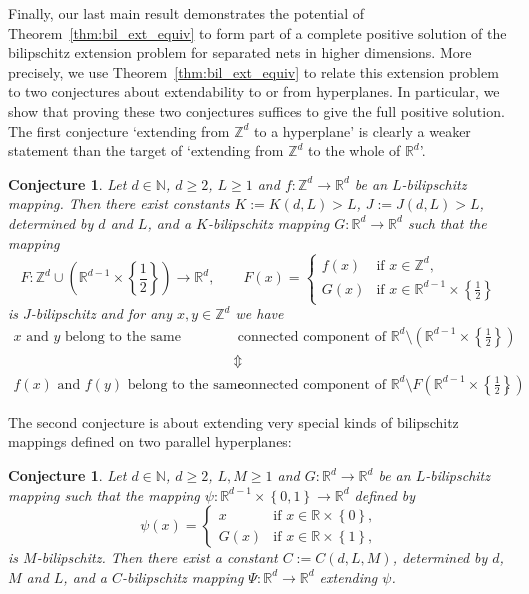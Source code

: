 \documentclass[a4paper, bibliography=totoc]{scrartcl}
\newtheorem{conjecture}[define]{Conjecture}
\numberwithin{claimcounter}{define}
\newcommand{\R}{\mathbb{R}}
\newcommand{\Z}{\mathbb{Z}}
\newcommand{\N}{\mathbb{N}}
\newcommand{\set}[1]{\left\{#1\right\}}
\newcommand{\br}[1]{\left(#1\right)}
\begin{document}
Finally, our last main result demonstrates the potential of Theorem~\ref{thm:bil_ext_equiv} to form part of a complete positive solution of the bilipschitz extension problem for separated nets in higher dimensions. More precisely, we use Theorem~\ref{thm:bil_ext_equiv} to relate this extension problem to two conjectures about extendability to or from hyperplanes. In particular, we show that proving these two conjectures suffices to give the full positive solution. The first conjecture `extending from $\Z^{d}$ to a hyperplane' is clearly a weaker statement than the target of `extending from $\Z^{d}$ to the whole of $\R^{d}$'.
\begin{conjecture}\label{conj1}
	Let $d\in \N$, $d\geq 2$, $L\geq 1$ and $f\colon \Z^{d}\to \R^{d}$ be an $L$-bilipschitz mapping. Then there exist constants $K:=K(d,L)>L$, $J:=J(d,L)>L$, determined by $d$ and $L$, and a $K$-bilipschitz mapping $G\colon \R^{d}\to\R^{d}$ such that the mapping 
	\begin{equation*}
	F\colon \Z^{d}\cup\br{\R^{d-1}\times \set{\frac{1}{2}}}\to \R^{d},\qquad F(x)=\begin{cases}
	f(x) & \text{if }x\in\Z^{d},\\
	G(x) & \text{if }x\in\R^{d-1}\times\set{\frac{1}{2}}
	\end{cases}
	\end{equation*}
	is $J$-bilipschitz and for any $x,y\in\Z^{d}$ we have
	\begin{align*}
	\text{$x$ and $y$ belong to the same} &\text{ connected component of $\R^{d}\setminus \br{\R^{d-1}\times\set{\frac{1}{2}}}$}\\
	&\Updownarrow\\
	\text{$f(x)$ and $f(y)$ belong to the same} &\text{ connected component of $\R^{d}\setminus F\br{\R^{d-1}\times\set{\frac{1}{2}}}$}.
	\end{align*}
\end{conjecture} 
The second conjecture is about extending very special kinds of bilipschitz mappings defined on two parallel hyperplanes:
\begin{conjecture}\label{conj2}
	Let $d\in\N$, $d\geq 2$, $L,M\geq 1$ and $G\colon \R^{d}\to\R^{d}$ be an $L$-bilipschitz mapping such that the mapping $\psi\colon\R^{d-1}\times\set{0,1}\to\R^{d}$ defined by
	\begin{equation*}
	\psi(x)=\begin{cases}
	x & \text{if }x\in\R\times\set{0},\\
	G(x) & \text{if }x\in\R\times\set{1},
	\end{cases}
	\end{equation*}
	is $M$-bilipschitz. Then there exist a constant $C:=C(d,L,M)$, determined by $d$, $M$ and $L$, and a $C$-bilipschitz mapping $\Psi\colon\R^{d}\to\R^{d}$ extending $\psi$.
\end{conjecture}
\end{document}
